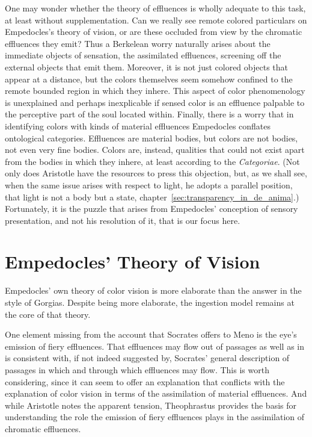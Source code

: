 One may wonder whether the theory of effluences is wholly adequate to this task, at least without supplementation. Can we really see remote colored particulars on Empedocles's theory of vision, or are these occluded from view by the chromatic effluences they emit? Thus a Berkelean worry naturally arises about the immediate objects of sensation, the assimilated effluences, screening off the external objects that emit them. Moreover, it is not just colored objects that appear at a distance, but the colors themselves seem somehow confined to the remote bounded region in which they inhere. This aspect of color phenomenology is unexplained and perhaps inexplicable if sensed color is an effluence palpable to the perceptive part of the soul located within. Finally, there is a worry that in identifying colors with kinds of material effluences Empedocles conflates ontological categories. Effluences are material bodies, but colors are not bodies, not even very fine bodies. Colors are, instead, qualities that could not exist apart from the bodies in which they inhere, at least according to the \emph{Categoriae}. (Not only does Aristotle have the resources to press this objection, but, as we shall see, when the same issue arises with respect to light, he adopts a parallel position, that light is not a body but a state, chapter~\ref{sec:transparency_in_de_anima}.) Fortunately, it is the puzzle that arises from Empedocles' conception of sensory presentation, and not his resolution of it, that is our focus here.


\section{Empedocles' Theory of Vision} %
\label{sec:empedocles_theory_of_vision}

Empedocles' own theory of color vision is more elaborate than the answer in the style of Gorgias. Despite being more elaborate, the ingestion model remains at the core of that theory. 

One element missing from the account that Socrates offers to Meno is the eye's emission of fiery effluences. That effluences may flow out of passages as well as in is consistent with, if not indeed suggested by, Socrates' general description of passages in which and through which effluences may flow. This is worth considering, since it can seem to offer an explanation that conflicts with the explanation of color vision in terms of the assimilation of material effluences. And while Aristotle notes the apparent tension, Theophrastus provides the basis for understanding the role the emission of fiery effluences plays in the assimilation of chromatic effluences.

